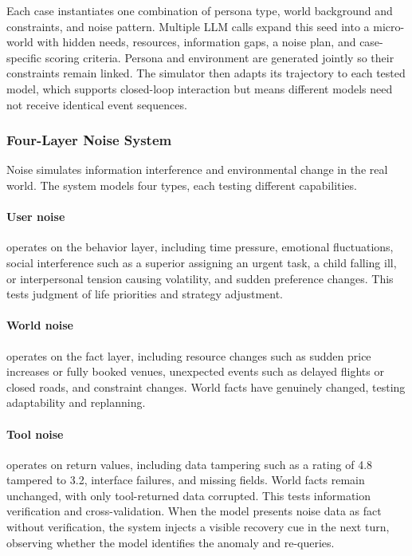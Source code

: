 Each case instantiates one combination of persona type, world background and constraints, and noise pattern. Multiple LLM calls expand this seed into a micro-world with hidden needs, resources, information gaps, a noise plan, and case-specific scoring criteria. Persona and environment are generated jointly so their constraints remain linked. The simulator then adapts its trajectory to each tested model, which supports closed-loop interaction but means different models need not receive identical event sequences.


\subsubsection{Four-Layer Noise System}
\label{sec:livingbench_noise}

Noise simulates information interference and environmental change in the real world. The system models four types, each testing different capabilities.

\paragraph{User noise} operates on the behavior layer, including time pressure, emotional fluctuations, social interference such as a superior assigning an urgent task, a child falling ill, or interpersonal tension causing volatility, and sudden preference changes. This tests judgment of life priorities and strategy adjustment.

\paragraph{World noise} operates on the fact layer, including resource changes such as sudden price increases or fully booked venues, unexpected events such as delayed flights or closed roads, and constraint changes. World facts have genuinely changed, testing adaptability and replanning.

\paragraph{Tool noise} operates on return values, including data tampering such as a rating of 4.8 tampered to 3.2, interface failures, and missing fields. World facts remain unchanged, with only tool-returned data corrupted. This tests information verification and cross-validation. When the model presents noise data as fact without verification, the system injects a visible recovery cue in the next turn, observing whether the model identifies the anomaly and re-queries.

